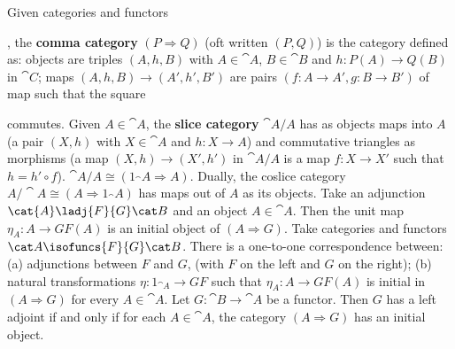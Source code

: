  Given categories and functors 
, the \textbf{comma category} $(P \Rightarrow Q)$ (oft written $(P \comma Q)$) is the category defined as: objects are triples $(A, h, B)$ with $A \in \cat A$, $B \in \cat B$ and $h : P(A) \to Q(B)$ in $\cat C$; maps $(A,h,B) \to (A',h',B')$ are pairs $(f: A \to A', g: B \to B')$ of map such that the square 
 commutes.
 Given $A \in \cat{A}$, the \textbf{slice category} $\cat{A}/A$ has as objects maps into $A$ (a pair $(X, h)$ with $X \in \cat{A}$ and $h : X \to A$) and commutative triangles as morphisms (a map $(X, h) \to (X', h')$ in $\cat{A}/A$ is a map $f : X \to X'$ such that $h = h' \circ f$). $\cat{A}/A \cong (1_\cat{A} \Rightarrow A)$. Dually, the coslice category $A/\cat{A} \cong (A \Rightarrow 1_\cat{A})$ has maps out of $A$ as its objects.
 Take an adjunction $\cat{A} \ladj{F}{G} \cat B$  and an object $A \in \cat A$. Then the unit map $\eta_A : A \to GF(A)$ is an initial object of $(A \Rightarrow G)$.
 Take categories and functors $\cat A \isofuncs{F}{G} \cat B$. There is a one-to-one correspondence between: (a) adjunctions between $F$ and $G$, (with $F$ on the left and $G$ on the right); (b) natural transformations $\eta : 1_{\cat{A}} \to GF$ such that $\eta_A : A \to GF(A)$ is initial in $(A \Rightarrow G)$ for every $A \in \cat{A}$.
 Let $G: \cat{B} \to \cat{A}$ be a functor. Then $G$ has a left adjoint if and only if for each $A \in \cat{A}$, the  category $(A \Rightarrow G)$ has an initial object.
